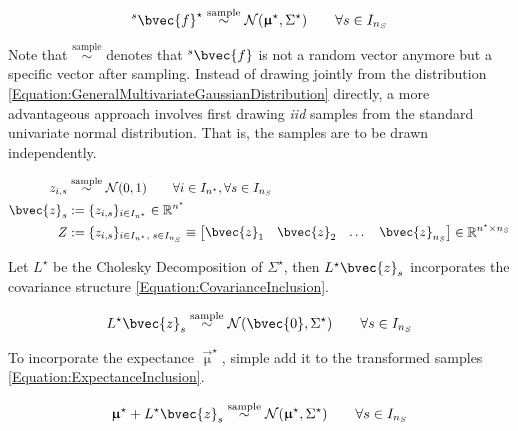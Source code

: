 			\begin{equation}
				{^{s}}\bvec{f}^{\star} \stackrel{\text{sample}}{\sim} \mathcal{N}(\vec{\upmu}^{\star}, \Sigma^{\star}) \qquad \forall s \in I_{n_{S}}
			\label{Equation:GeneralMultivariateGaussianDistribution}
			\end{equation}
			
			Note that $\stackrel{\text{sample}}{\sim}$ denotes that ${^{s}}\bvec{f}$ is not a random vector anymore but a specific vector after sampling. Instead of drawing jointly from the distribution \eqref{Equation:GeneralMultivariateGaussianDistribution} directly, a more advantageous approach involves first drawing \textit{iid} samples from the standard univariate normal distribution. That is, the samples are to be drawn independently.
			
			\begin{equation}
				\begin{aligned}
					z_{i, s} &\stackrel{\text{sample}}{\sim} \mathcal{N}(0, 1) \qquad \forall i \in I_{n^{\star}}, \forall s \in I_{n_{S}} \\
					\bvec{z}_{s} &:= \{z_{i, s}\}_{i \in I_{n^{\star}}} \in \mathbb{R}^{n^{\star}} \\
					Z &:= \{z_{i, s}\}_{i \in I_{n^{\star}}, \; s \in I_{n_{S}}} \equiv \begin{bmatrix} \bvec{z}_{1} & \bvec{z}_{2} & \dots & \bvec{z}_{n_{S}} \end{bmatrix} \in \mathbb{R}^{n^{\star} \times n_{S}}
				\end{aligned}
			\label{Equation:iidGaussianSampling}
			\end{equation}			
			
			Let $L^{\star}$ be the Cholesky Decomposition of $\Sigma^{\star}$, then $L^{\star} \bvec{z}_{s}$ incorporates the covariance structure \eqref{Equation:CovarianceInclusion}.
			
			\begin{equation}
				\begin{aligned}
					L^{\star} \bvec{z}_{s} \stackrel{\text{sample}}{\sim} \mathcal{N}(\bvec{0}, \Sigma^{\star}) \qquad \forall s \in I_{n_{S}}
				\end{aligned}
			\label{Equation:CovarianceInclusion}
			\end{equation}
			
			To incorporate the expectance $\vec{\upmu}^{\star}$, simple add it to the transformed samples \eqref{Equation:ExpectanceInclusion}.
			
			\begin{equation}
				\begin{aligned}
					\vec{\upmu}^{\star} + L^{\star} \bvec{z}_{s} \stackrel{\text{sample}}{\sim} \mathcal{N}(\vec{\upmu}^{\star}, \Sigma^{\star}) \qquad \forall s \in I_{n_{S}}
				\end{aligned}
			\label{Equation:ExpectanceInclusion}
			\end{equation}
			
